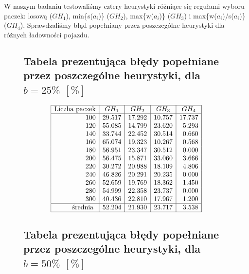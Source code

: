 \documentclass[polish,polish,a4paper]{article}
\begin{document}
\begin{spacing}{1.35}
W naszym badaniu testowaliśmy cztery heurystyki różniące się regułami wyboru paczek: losową ($GH_{1}$), min\{s($a_{i}$)\} ($GH_{2}$), max\{w($a_{i}$)\} ($GH_{3}$) i max\{w($a_{i}$)/s($a_{i}$)\} ($GH_{4}$). Sprawdzaliśmy błąd popełniany przez poszczególne heurystyki dla różnych ładowności pojazdu. 


\begin{figure}[H]
	{\centering
\subsection*{Tabela prezentująca błędy popełniane przez poszczególne heurystyki, dla $b = 25 \%$ $ [\%] $
	}}
\begin{spacing}{1.7}
	\begin{equation*}
	\begin{array}{|r|r|r|r|r|}
	\hline
	\multicolumn{1}{|c|}{$Liczba paczek$}&\multicolumn{1}{c|}{GH_{1}}&\multicolumn{1}{c|}{GH_{2}}&\multicolumn{1}{c|}{GH_{3}}&\multicolumn{1}{c|}{GH_{4}}\\\hline
	100&29.517&17.292&10.757&17.737\\
	120&55.085&14.799&23.620&5.293\\
	140&33.744&22.452&30.514&0.660\\
	160&65.074&19.323&10.267&0.568\\
	180&56.951&23.347&30.512&0.000\\
	200&56.475&15.871&33.060&3.666\\
	220&30.272&20.988&18.109&4.806\\
	240&46.826&20.291&20.235&0.000\\
	260&52.659&19.769&18.362&1.450\\
	280&54.999&22.358&23.737&0.000\\
	300&40.436&22.810&17.967&1.200\\
	\hline
	$ średnia $&52.204&21.930&23.717&3.538\\
	\hline
	\end{array}
	\end{equation*}
\end{spacing}
\end{figure}


\begin{figure}[H]
			{\centering
		\subsection*{Tabela prezentująca błędy popełniane przez poszczególne heurystyki, dla $b = 50 \%$ $ [\%] $
	}}
	\begin{spacing}{1.7}


\end{spacing}
\end{figure}
\end{spacing}
\end{document}

